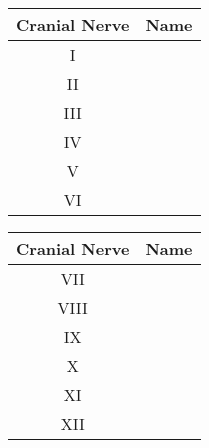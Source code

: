 \begin{enumerate}[label=\textbf{Q1.7.\arabic*}]
            \begin{multicols}{2}
                  \begin{tabular}{cc}
                        \toprule
                        \textbf{Cranial Nerve} & \textbf{Name}            \\ \midrule
                        I                      & \underline{\hspace{3cm}} \\[0.5em]
                        II                     & \underline{\hspace{3cm}} \\[0.5em]
                        III                    & \underline{\hspace{3cm}} \\[0.5em]
                        IV                     & \underline{\hspace{3cm}} \\[0.5em]
                        V                      & \underline{\hspace{3cm}} \\[0.5em]
                        VI                     & \underline{\hspace{3cm}} \\[0.5em]
                        \bottomrule
                  \end{tabular}
                  \begin{tabular}{cc}
                        \toprule
                        \textbf{Cranial Nerve} & \textbf{Name}            \\ \midrule
                        VII                    & \underline{\hspace{3cm}} \\[0.5em]
                        VIII                   & \underline{\hspace{3cm}} \\[0.5em]
                        IX                     & \underline{\hspace{3cm}} \\[0.5em]
                        X                      & \underline{\hspace{3cm}} \\[0.5em]
                        XI                     & \underline{\hspace{3cm}} \\[0.5em]
                        XII                    & \underline{\hspace{3cm}} \\[0.5em]
                        \bottomrule
                  \end{tabular}
            \end{multicols}

\end{enumerate}

